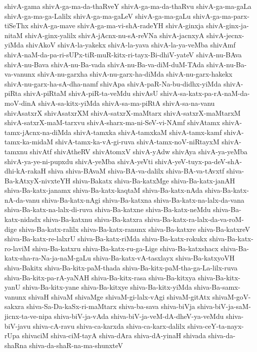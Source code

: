 {shivA-gama
shivA-ga-ma-da-thaRveY
shivA-ga-ma-da-thaRvu
shivA-ga-ma-gaLa
shivA-ga-ma-ga-Lalilx
shivA-ga-ma-gaLeV
shivA-ga-ma-gaLu
shivA-ga-ma-parx-tiSeThx
shivA-ga-mave
shivA-ga-ma-vi-shA-radeYH
shivA-ginxja
shivA-ginx-ja-nitaM
shivA-ginx-yalilx
shivA-jAcnx-nu-sA-reVNa
shivA-jacnxyA
shivA-jecnx-yiMda
shivAkoV
shivA-la-yakekx
shivA-la-yava
shivA-la-ya-veMba
shivAmf
shivA-naM-da-pa-ri-sUPx-tiR-muR-kitx-ri-tayx-Bi-dhiV-yateV
shivA-nu-BAva
shivA-nu-Bava
shivA-nu-Ba-vada
shivA-nu-Ba-va-diM-duM-TAda
shivA-nu-Ba-va-vanunx
shivA-nu-garxha
shivA-nu-garx-ha-diMda
shivA-nu-garx-hakekx
shivA-nu-garx-ha-sA-dha-namf
shivApa
shivA-paR-Na-bu-didhx-yiMda
shivA-piRta
shivA-piRtaM
shivA-piR-ta-veMdu
shivAsU
shivA-sa-katx-pa-rA-naM-da-moV-dinA
shivA-sa-kitx-yiMda
shivA-sa-ma-piRtA
shivA-sa-na-vanu
shivAsatxrX
shivAsatxrXM
shivA-satxrX-maMtarx
shivA-satxrX-maMtarxM
shivA-satxrX-maM-tarxvu
shivA-sharx-ma-ni-SeV-vi-NAmf
shivAtamx
shivA-tamx-jAcnx-na-diMda
shivA-tamxka
shivA-tamxkaM
shivA-tamx-kamf
shivA-tamx-ka-midaM
shivA-tamx-ka-vA-gi-ruva
shivA-tamx-noV-niRtayxM
shivA-tamxnu
shivAtf
shivAtheRV
shivAtomxV
shivA-yAdw
shivAya
shivA-ya-yeMba
shivA-ya-ye-ni-pupxdu
shivA-yeMba
shivA-yeVti
shivA-yeV-tuyx-pa-deV-shA-dhi-kA-rakaH
shiva
shiva-BAvaM
shiva-BA-va-dalilx
shiva-BA-va-tAvxtf
shiva-Ba-kAtxyX-nivxteYH
shiva-Bakatx
shiva-Ba-katxMge
shiva-Ba-katx-janAH
shiva-Ba-katx-janamx
shiva-Ba-katx-kaqtaM
shiva-Ba-katx-nAda
shiva-Ba-katx-nA-da-vanu
shiva-Ba-katx-nAgi
shiva-Ba-katxna
shiva-Ba-katx-na-lalx-da-vana
shiva-Ba-katx-na-lalx-di-ruva
shiva-Ba-katxne
shiva-Ba-katx-neMdu
shiva-Ba-katx-nidadx
shiva-Ba-katxnu
shiva-Ba-katxra
shiva-Ba-katx-ra-lalx-da-va-roM-dige
shiva-Ba-katx-ralilx
shiva-Ba-katx-ranunx
shiva-Ba-katxre
shiva-Ba-katxreV
shiva-Ba-katx-re-lalxrU
shiva-Ba-katx-riMda
shiva-Ba-katx-rokukx
shiva-Ba-katx-ro-laviM
shiva-Ba-katxru
shiva-Ba-katx-ru-ga-Lige
shiva-Ba-katxshacx
shiva-Ba-katx-sha-ra-Na-ja-naM-gaLu
shiva-Ba-katx-vA-tasxlayx
shiva-Ba-katxyoVH
shiva-Bakitx
shiva-Ba-kitx-paM-thada
shiva-Ba-kitx-paM-tha-ga-La-lilx-ruva
shiva-Ba-kitx-pa-rA-yaNAH
shiva-Ba-kitx-rasa
shiva-Ba-kitxya
shiva-Ba-kitx-yanU
shiva-Ba-kitx-yane
shiva-Ba-kitxye
shiva-Ba-kitx-yiMda
shiva-Ba-samx-vanunx
shivaH
shivaM
shivaMge
shivaM-gi-lalx-vAgi
shivaM-gitAtx
shivaM-goV-sakxra
shiva-Sa-Da-kaSx-ri-maMtarx
shiva-ba-sava
shiva-biVja
shiva-biV-ja-saM-jicnx-ta-ve-nipa
shiva-biV-ja-vAda
shiva-biV-ja-veM-dA-dheV-ya-veMdu
shiva-biV-javu
shiva-cA-ravu
shiva-ca-karxda
shiva-ca-karx-dalilx
shiva-ceY-ta-nayx-rUpa
shivaciM
shiva-ciM-tayA
shiva-dAra
shiva-dA-yinaH
shivada
shiva-da-shaRna
shiva-da-shaR-na-ma-shunxteV
}
